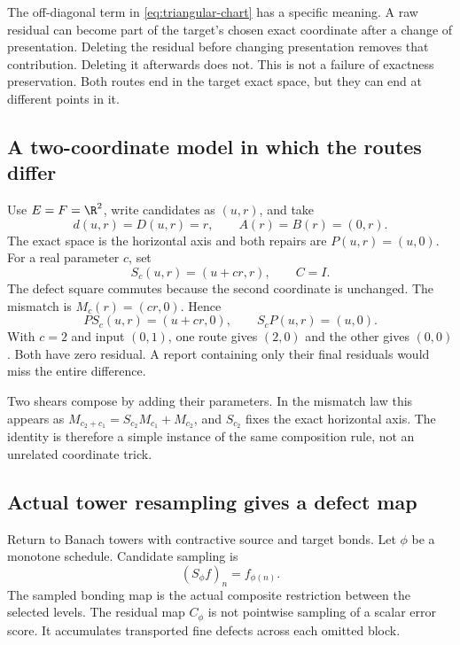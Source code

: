 The off-diagonal term in \eqref{eq:triangular-chart} has a specific meaning. A raw residual can become part of the target's chosen exact coordinate after a change of presentation. Deleting the residual before changing presentation removes that contribution. Deleting it afterwards does not. This is not a failure of exactness preservation. Both routes end in the target exact space, but they can end at different points in it.

\subsection{A two-coordinate model in which the routes differ}
Use \(E=F=\R^2\), write candidates as \((u,r)\), and take
\[
 d(u,r)=D(u,r)=r,\qquad A(r)=B(r)=(0,r).
\]
The exact space is the horizontal axis and both repairs are \(P(u,r)=(u,0)\). For a real parameter \(c\), set
\[
 S_c(u,r)=(u+cr,r),\qquad C=I.
\]
The defect square commutes because the second coordinate is unchanged. The mismatch is \(M_c(r)=(cr,0)\). Hence
\[
 PS_c(u,r)=(u+cr,0),\qquad S_cP(u,r)=(u,0).
\]
With \(c=2\) and input \((0,1)\), one route gives \((2,0)\) and the other gives \((0,0)\). Both have zero residual. A report containing only their final residuals would miss the entire difference.


Two shears compose by adding their parameters. In the mismatch law this appears as \(M_{c_2+c_1}=S_{c_2}M_{c_1}+M_{c_2}\), and \(S_{c_2}\) fixes the exact horizontal axis. The identity is therefore a simple instance of the same composition rule, not an unrelated coordinate trick.

\subsection{Actual tower resampling gives a defect map}
Return to Banach towers with contractive source and target bonds. Let \(\phi\) be a monotone schedule. Candidate sampling is
\[
 (S_\phi f)_n=f_{\phi(n)}.
\]
The sampled bonding map is the actual composite restriction between the selected levels. The residual map \(C_\phi\) is not pointwise sampling of a scalar error score. It accumulates transported fine defects across each omitted block.

